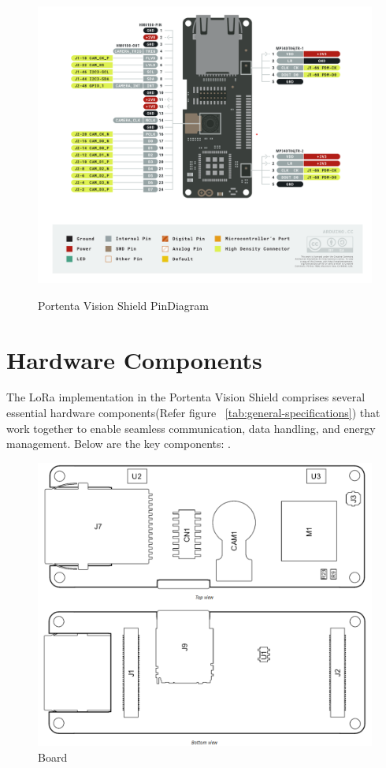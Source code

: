 \begin{figure}
	\begin{center}
		\includegraphics[width=0.7\linewidth]{Images/VisionShield/PinDiagram.png}
		\caption{Portenta Vision Shield PinDiagram}
		\label{PinDiagram} \cite{arduino_datasheet:2025}
	\end{center}
\end{figure}



\section{Hardware Components}

The LoRa implementation in the Portenta Vision Shield comprises several essential hardware components(Refer figure ~\ref{tab:general-specifications}) that work together to enable seamless communication, data handling, and energy management. Below are the key components:  \cite{arduino_portenta:2025}.

\begin{figure}
	\begin{center}
		\includegraphics[width=0.7\linewidth]{Images/VisionShield/BoardTopology.png}
		\caption{Board}
		\label{BoardTopology}
	\end{center}
\end{figure}

